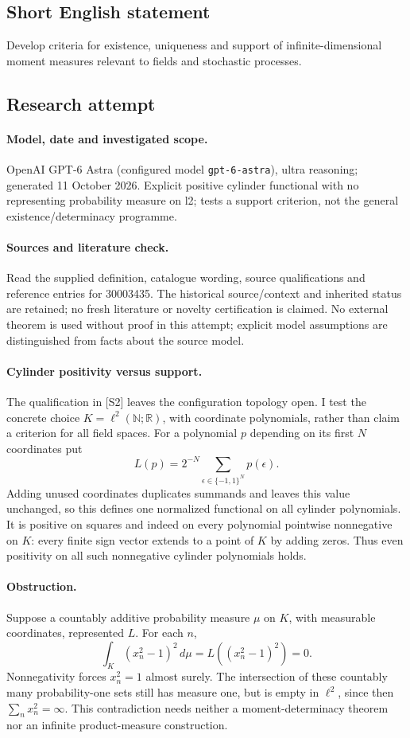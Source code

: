 \documentclass[11pt]{article}
\begin{document}
\subsection{Short English statement}
Develop criteria for existence, uniqueness and support of infinite-dimensional moment measures relevant to fields and stochastic processes.
\subsection{Research attempt}
\paragraph{Model, date and investigated scope.}
OpenAI GPT-6 Astra (configured model \texttt{gpt-6-astra}), ultra reasoning; generated 11 October 2026. Explicit positive cylinder functional with no representing probability measure on l2; tests a support criterion, not the general existence/determinacy programme.

\paragraph{Sources and literature check.}
Read the supplied definition, catalogue wording, source qualifications and reference entries for 30003435. The historical source/context and inherited status are retained; no fresh literature or novelty certification is claimed. No external theorem is used without proof in this attempt; explicit model assumptions are distinguished from facts about the source model.

\paragraph{Cylinder positivity versus support.} The qualification in [S2] leaves the configuration topology open. I test the concrete choice \(K=\ell^2(\mathbb N;\mathbb R)\), with coordinate polynomials, rather than claim a criterion for all field spaces. For a polynomial \(p\) depending on its first \(N\) coordinates put
\[
 L(p)=2^{-N}\sum_{\epsilon\in\{-1,1\}^N}p(\epsilon).
\]
Adding unused coordinates duplicates summands and leaves this value unchanged, so this defines one normalized functional on all cylinder polynomials. It is positive on squares and indeed on every polynomial pointwise nonnegative on \(K\): every finite sign vector extends to a point of \(K\) by adding zeros. Thus even positivity on all such nonnegative cylinder polynomials holds.
\paragraph{Obstruction.} Suppose a countably additive probability measure \(\mu\) on \(K\), with measurable coordinates, represented \(L\). For each \(n\),
\[
 \int_K(x_n^2-1)^2\,d\mu=L((x_n^2-1)^2)=0.
\]
Nonnegativity forces \(x_n^2=1\) almost surely. The intersection of these countably many probability-one sets still has measure one, but is empty in \(\ell^2\), since then \(\sum_nx_n^2=\infty\). This contradiction needs neither a moment-determinacy theorem nor an infinite product-measure construction.
\end{document}
